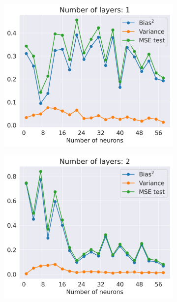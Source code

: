 \documentclass[11pt]{article}
\begin{document}
\begin{figure}[H]
    \begin{subfigure}{.5\textwidth}
        \centering
        \includegraphics[width=.9\textwidth]{figures/tradeoff_NN_neurons_1.png}
        \label{fig:}
    \end{subfigure}
    \begin{subfigure}{.5\textwidth}
        \centering
        \includegraphics[width=.9\textwidth]{figures/tradeoff_NN_neurons_2.png}
        \label{fig:}
    \end{subfigure}
    \begin{subfigure}{.5\textwidth}
        \centering

\end{subfigure}
\end{figure}
\end{document}
